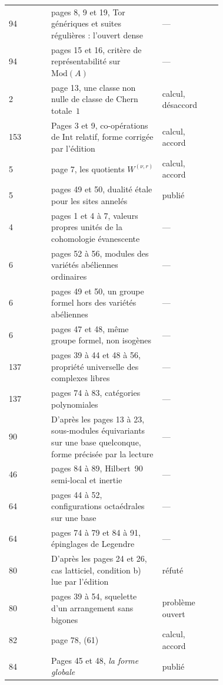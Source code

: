 {\begin{longtable}{@{}l>{\raggedright\arraybackslash}p{0.52\linewidth}>{\raggedright\arraybackslash}p{0.2\linewidth}r@{}}
94 & pages 8, 9 et 19, Tor génériques et suites régulières : l'ouvert dense & --- & \pageref{nv:59}\\
94 & pages 15 et 16, critère de représentabilité sur $\mathrm{Mod}(A)$ & --- & \pageref{nv:60}\\
2 & page 13, une classe non nulle de classe de Chern totale~$1$ & calcul, désaccord & \pageref{nv:61}\\
153 & Pages 3 et 9, co-opérations de $\mathrm{Int}$ relatif, forme corrigée par l'édition & calcul, accord & \pageref{nv:62}\\
5 & page 7, les quotients $W^{(\nu,r)}$ & calcul, accord & \pageref{nv:63}\\
5 & pages 49 et 50, dualité étale pour les sites annelés & publié & \pageref{nv:64}\\
4 & pages 1 et 4 à 7, valeurs propres unités de la cohomologie évanescente & --- & \pageref{nv:65}\\
6 & pages 52 à 56, modules des variétés abéliennes ordinaires & --- & \pageref{nv:66}\\
6 & pages 49 et 50, un groupe formel hors des variétés abéliennes & --- & \pageref{nv:67}\\
6 & pages 47 et 48, même groupe formel, non isogènes & --- & \pageref{nv:68}\\
137 & pages 39 à 44 et 48 à 56, propriété universelle des complexes libres & --- & \pageref{nv:69}\\
137 & pages 74 à 83, catégories polynomiales & --- & \pageref{nv:70}\\
90 & D'après les pages 13 à 23, sous-modules équivariants sur une base quelconque, forme précisée par la lecture & --- & \pageref{nv:71}\\
46 & pages 84 à 89, Hilbert~90 semi-local et inertie & --- & \pageref{nv:72}\\
64 & pages 44 à 52, configurations octaédrales sur une base & --- & \pageref{nv:73}\\
64 & pages 74 à 79 et 84 à 91, épinglages de Legendre & --- & \pageref{nv:74}\\
80 & D'après les pages 24 et 26, cas latticiel, condition b) lue par l'édition & réfuté & \pageref{nv:75}\\
80 & pages 39 à 54, squelette d'un arrangement sans bigones & problème ouvert & \pageref{nv:76}\\
82 & page 78, (61) & calcul, accord & \pageref{nv:77}\\
84 & Pages 45 et 48, \emph{la forme globale} & publié & \pageref{nv:78}\\

\end{longtable}}
